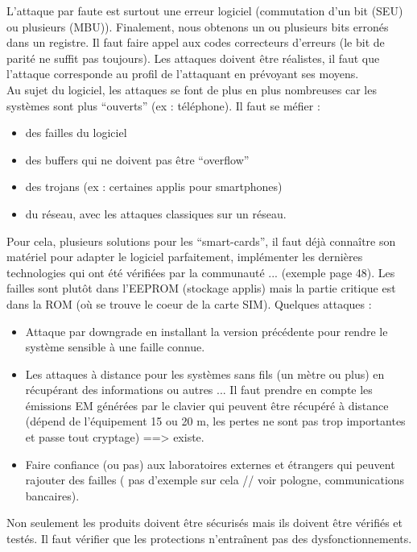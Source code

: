 \documentclass[a4paper,12pt]{article}
\begin{document}
L'attaque par faute est surtout une erreur logiciel (commutation d'un bit (SEU) ou plusieurs (MBU)). Finalement, nous obtenons un ou plusieurs bits erronés dans un registre. Il faut faire appel aux codes correcteurs d'erreurs (le bit de parité ne suffit pas toujours).
Les attaques doivent être réalistes, il faut que l'attaque corresponde au profil de l'attaquant en prévoyant ses moyens.
\\
Au sujet du logiciel, les attaques se font de plus en plus nombreuses car les systèmes sont plus ``ouverts'' (ex : téléphone). Il faut se méfier : 
\begin{itemize}
\item des failles du logiciel
\item des buffers qui ne doivent pas être ``overflow''
\item des trojans (ex : certaines applis pour smartphones)
\item du réseau, avec les attaques classiques sur un réseau.
\end{itemize}
Pour cela, plusieurs solutions pour les ``smart-cards'', il faut déjà connaître son matériel pour adapter le logiciel parfaitement, implémenter les dernières technologies qui ont été vérifiées par la communauté ... (exemple page 48). Les failles sont plutôt dans l'EEPROM (stockage applis) mais la partie critique est dans la ROM (où se trouve le coeur de la carte SIM). Quelques attaques :
\begin{itemize}
\item Attaque par downgrade en installant la version précédente pour rendre le système sensible à une faille connue.
\item Les attaques à distance pour les systèmes sans fils (un mètre ou plus) en récupérant des informations ou autres ... Il faut prendre en compte les émissions EM générées par le clavier qui peuvent être récupéré à distance (dépend de l'équipement 15 ou 20 m, les pertes ne sont pas trop importantes et passe tout cryptage) ==> existe.
\item Faire confiance (ou pas) aux laboratoires externes et étrangers qui peuvent rajouter des failles ( pas d'exemple sur cela // voir pologne, communications bancaires).
\end{itemize}
Non seulement les produits doivent être sécurisés mais ils doivent être vérifiés et testés. Il faut vérifier que les protections n'entraînent pas des dysfonctionnements. 
\end{document}
